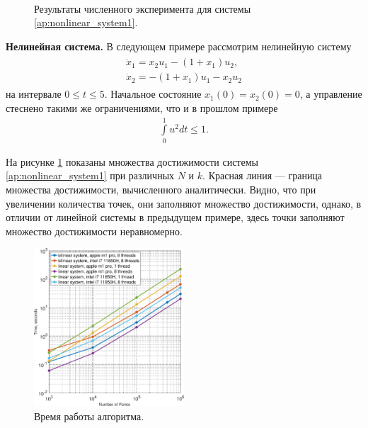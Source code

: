 \documentclass[../main.tex]{subfiles}
\begin{document}
\begin{figure}[ht!]
\begin{minipage}[b]{.3\linewidth}
  	\end{minipage} 
  	\caption{Результаты численного эксперимента для системы \eqref{ap:nonlinear_system1}.}\label{fig:ap:rs_nonlinear1}
  \end{figure}
  
   \textbf{Нелинейная система.} В следующем примере рассмотрим нелинейную систему 
   \begin{gather}\label{ap:nonlinear_system1}
   	\begin{gathered}
   	\dot{x}_1 = x_2 u_1 - (1 + x_1) u_2,\\
   	\dot{x}_2 = -(1 + x_1) u_1 - x_2 u_2
   	\end{gathered}
   \end{gather}
   на интервале  $ 0 \leqslant t \leqslant 5$.
    Начальное состояние $x_1(0) = x_2(0) = 0 $, а управление стеснено такими же ограничениями, что и в прошлом примере
   \begin{gather*}
   	\int\limits_0^1 u^2dt \leqslant 1.
   \end{gather*}
   
     На рисунке \ref{fig:ap:rs_nonlinear1} показаны множества достижимости системы \eqref{ap:nonlinear_system1} при различных $N$ и $k$.
       Красная линия --- граница множества достижимости, вычисленного аналитически.
   Видно, что при увеличении количества точек, они заполняют множество достижимости, однако, в отличии от линейной системы в предыдущем примере, здесь точки заполняют множество достижимости неравномерно.
   
     \begin{figure}[ht]
   	\centering
   	\includegraphics[width=0.5\textwidth]{images/time_complexity.eps}
   	\caption{Время работы алгоритма.}
   	\label{fig:ap:timings}
   \end{figure}
   
\end{document}
